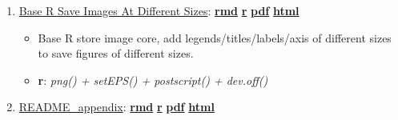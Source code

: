 \documentclass[
]{book}
\providecommand{\tightlist}{%
  \setlength{\itemsep}{0pt}\setlength{\parskip}{0pt}}
\begin{document}
\begin{enumerate}
\def\labelenumi{\arabic{enumi}.}
\tightlist
\item
  \href{https://fanwangecon.github.io/R4Econ/tabgraph/inout/htmlpdfr/fs_img_io.html}{Base R Save Images At Different Sizes}: \href{https://github.com/FanWangEcon/R4Econ/blob/master/tabgraph/inout//fs_img_io.Rmd}{\textbf{rmd}} \textbar{} \href{https://github.com/FanWangEcon/R4Econ/blob/master/tabgraph/inout/htmlpdfr/fs_img_io.R}{\textbf{r}} \textbar{} \href{https://github.com/FanWangEcon/R4Econ/blob/master/tabgraph/inout/htmlpdfr/fs_img_io.pdf}{\textbf{pdf}} \textbar{} \href{https://fanwangecon.github.io/R4Econ/tabgraph/inout/htmlpdfr/fs_img_io.html}{\textbf{html}}

  \begin{itemize}
  \tightlist
  \item
    Base R store image core, add legends/titles/labels/axis of different sizes to save figures of different sizes.
  \item
    \textbf{r}: \emph{png() + setEPS() + postscript() + dev.off()}
  \end{itemize}
\item
  \href{https://fanwangecon.github.io/R4Econ//htmlpdfr/README_appendix.html}{README\_appendix}: \href{https://github.com/FanWangEcon/R4Econ/blob/master///README_appendix.Rmd}{\textbf{rmd}} \textbar{} \href{https://github.com/FanWangEcon/R4Econ/blob/master//htmlpdfr/README_appendix.R}{\textbf{r}} \textbar{} \href{https://github.com/FanWangEcon/R4Econ/blob/master//htmlpdfr/README_appendix.pdf}{\textbf{pdf}} \textbar{} \href{https://fanwangecon.github.io/R4Econ//htmlpdfr/README_appendix.html}{\textbf{html}}
\end{enumerate}

  
\end{document}
